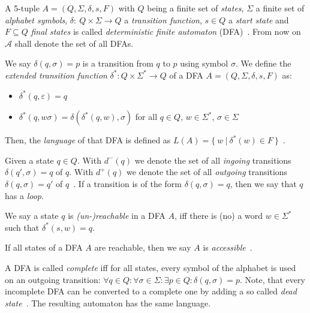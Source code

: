A 5-tuple $A = (Q, \Sigma, \delta, s, F)$ with $Q$ being a finite set of \emph{states}, $\Sigma$ a finite set of \emph{alphabet symbols}, $\delta \colon\ Q \times \Sigma \to Q$ a \emph{transition function}, $s \in Q$ a \emph{start state} and $F \subseteq Q$ \emph{final states} is called \emph{deterministic finite automaton} (DFA)~\cite[p. 46]{hopcroft01}. From now on $\mathcal{A}$ shall denote the set of all DFAs.

We say $\delta(q,\sigma) = p$ is a transition from $q$ to $p$ using symbol $\sigma$. We define the \emph{extended transition function} $\delta^* : Q \times \Sigma^* \to Q$ of a DFA $A = (Q, \Sigma, \delta, s, F)$ as:
\begin{itemize}
	\item $\delta^*(q,\varepsilon) = q$
	\item $\delta^*(q,w\sigma) = \delta(\delta^*(q,w),\sigma)$ for all $q \in Q$, $w \in \Sigma^*$, $\sigma \in \Sigma$
\end{itemize}
Then, the \emph{language} of that DFA is defined as $L(A) = \{\ w\ |\ \delta^*(w) \in F\ \}$~\cite[pp. 49-50. 52]{hopcroft01}.

Given a state $q \in Q$. With $d^-(q)$ we denote the set of all \emph{ingoing} transitions $\delta(q', \sigma) = q$ of $q$. With $d^+(q)$ we denote the set of all \emph{outgoing} transitions $\delta(q, \sigma) = q'$ of $q$~\cite[pp. 2-3]{champarnaud05}. If a transition is of the form $\delta(q, \sigma) = q$, then we say that $q$ has a \emph{loop}.

\begin{definition}\label{ch:1:unreachable-states}
	We say a state $q$ is \emph{(un-)reachable} in a DFA $A$, iff there is (no) a word $w \in \Sigma^*$ such that $\delta^*(s, w) = q$.
\end{definition}
\noindent If all states of a DFA $A$ are reachable, then we say $A$ is \emph{accessible}~\cite[p. 2]{champarnaud05}.

A DFA is called \emph{complete} iff for all states, every symbol of the alphabet is used on an outgoing transition: $\forall q\in Q\colon \forall\sigma\in\Sigma\colon \exists p\in Q\colon \delta(q,\sigma) = p$. Note, that every incomplete DFA can be converted to a complete one by adding a so called \emph{dead state}~\cite[p. 67]{hopcroft01}. The resulting automaton has the same language.

